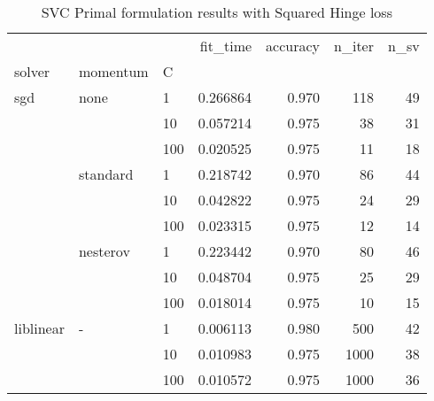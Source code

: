 \begin{table}[H]
\centering
\caption{SVC Primal formulation results with Squared Hinge loss}
\label{primal_svc_squared_hinge_cv_results}
\begin{tabular}{lllrrrr}
\toprule
          &   &     &  fit\_time &  accuracy &  n\_iter &  n\_sv \\
solver & momentum & C &           &           &         &       \\
\midrule
sgd & none & 1   &  0.266864 &     0.970 &     118 &    49 \\
          &   & 10  &  0.057214 &     0.975 &      38 &    31 \\
          &   & 100 &  0.020525 &     0.975 &      11 &    18 \\
          & standard & 1   &  0.218742 &     0.970 &      86 &    44 \\
          &   & 10  &  0.042822 &     0.975 &      24 &    29 \\
          &   & 100 &  0.023315 &     0.975 &      12 &    14 \\
          & nesterov & 1   &  0.223442 &     0.970 &      80 &    46 \\
          &   & 10  &  0.048704 &     0.975 &      25 &    29 \\
          &   & 100 &  0.018014 &     0.975 &      10 &    15 \\
liblinear & - & 1   &  0.006113 &     0.980 &     500 &    42 \\
          &   & 10  &  0.010983 &     0.975 &    1000 &    38 \\
          &   & 100 &  0.010572 &     0.975 &    1000 &    36 \\
\bottomrule
\end{tabular}
\end{table}
